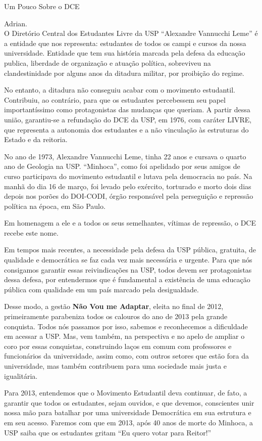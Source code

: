 \begin{secao}{Um Pouco Sobre o DCE}

 Adrian.\\

O Diretório Central dos Estudantes Livre da USP ``Alexandre Vannucchi Leme'' é a
entidade que nos representa: estudantes de todos os campi e cursos da nossa universidade.
Entidade que tem sua história marcada pela defesa da educação publica, liberdade
de organização e atuação política, sobreviveu na clandestinidade por alguns anos
da ditadura militar, por proibição do regime.

No entanto, a ditadura não conseguiu acabar com o movimento estudantil. Contribuiu,
ao contrário, para que os estudantes percebessem seu papel importantíssimo como
protagonistas das mudanças que queriam. A partir dessa união, garantiu-se a
refundação do DCE da USP, em 1976, com caráter LIVRE, que representa a autonomia
dos estudantes e a não vinculação às estruturas do Estado e da reitoria.

No ano de 1973, Alexandre Vannucchi Leme, tinha 22 anos e cursava o quarto ano
de Geologia na USP. ``Minhoca'', como foi apelidado por seus amigos de curso participava
do movimento estudantil e lutava pela democracia no país. Na manhã do dia 16 de março,
foi levado pelo exército, torturado e morto dois dias depois nos porões do DOI-CODI,
órgão responsável pela perseguição e repressão política na época, em São Paulo.

Em homenagem a ele e a todos os seus semelhantes, vítimas de repressão, o DCE recebe este nome.

Em tempos mais recentes, a necessidade pela defesa da USP pública, gratuita, de qualidade
e democrática se faz cada vez mais necessária e urgente. Para que nós consigamos
garantir essas reivindicações na USP, todos devem ser protagonistas dessa defesa,
por entendermos que é fundamental a existência de uma educação pública com qualidade
em um país marcado pela desigualdade.

Desse modo, a gestão {\bf Não Vou me Adaptar}, eleita no final de 2012, primeiramente
parabeniza todos os calouros do ano de 2013 pela grande conquista.
Todos nós passamos por isso, sabemos e reconhecemos a dificuldade em acessar a USP.
Mas, vem também, na perspectiva e no apelo de ampliar o coro por essas conquistas,
construindo laços em comum com professores e funcionários da universidade,
assim como, com outros setores que estão fora da universidade, mas também contribuem
para uma sociedade mais justa e igualitária.

Para 2013, entendemos que o Movimento Estudantil deva continuar, de fato, a garantir
que todos os estudantes, sejam ouvidos, e que devemos, conscientes unir nossa
mão para batalhar por uma universidade Democrática em sua estrutura e em seu acesso.
Faremos com que em 2013, após 40 anos de morte do Minhoca, a USP saiba que os estudantes
gritam ``Eu quero votar para Reitor!''

\end{secao}
